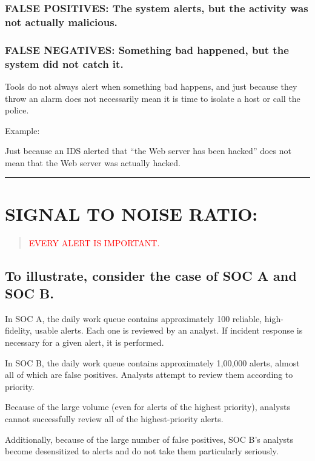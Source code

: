 \documentclass[10pt,british,english]{article}
\begin{document}
\subsubsection{FALSE POSITIVES: The system alerts, but the activity was not actually
malicious.}

\subsubsection{FALSE NEGATIVES: Something bad happened, but the system did not catch
it.}

Tools do not always alert when something bad happens, and just because
they throw an alarm does not necessarily mean it is time to isolate
a host or call the police. 

Example:

Just because an IDS alerted that \textquotedblleft the Web server
has been hacked\textquotedblright{} does not mean that the Web server
was actually hacked.

\rule[0.5ex]{1\columnwidth}{1pt}

\section{SIGNAL TO NOISE RATIO: }
\begin{quotation}
\noindent \textcolor{red}{EVERY ALERT IS IMPORTANT.}
\end{quotation}

\subsection{To illustrate, consider the case of SOC A and SOC B. }

In SOC A, the daily work queue contains approximately 100 reliable,
high-fidelity, usable alerts. Each one is reviewed by an analyst.
If incident response is necessary for a given alert, it is performed.

In SOC B, the daily work queue contains approximately 1,00,000 alerts,
almost all of which are false positives. Analysts attempt to review
them according to priority. 

Because of the large volume (even for alerts of the highest priority),
analysts cannot successfully review all of the highest-priority alerts. 

Additionally, because of the large number of false positives, SOC
B's analysts become desensitized to alerts and do not take them particularly
seriously.
\end{document}
